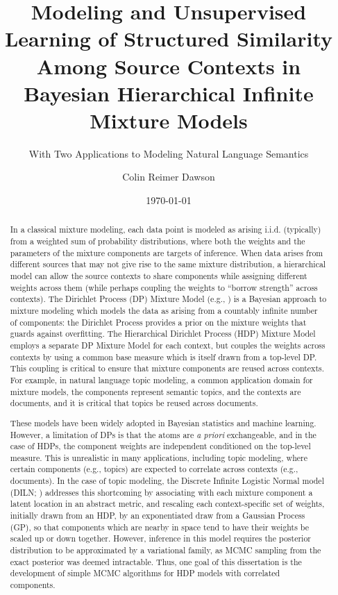 \documentclass[12pt,letterpaper]{report}
\title{Modeling and Unsupervised Learning of Structured Similarity Among
  Source Contexts in Bayesian Hierarchical Infinite Mixture Models}
\subtitle{With Two Applications to Modeling Natural Language Semantics}
\author{Colin Reimer Dawson}
\date{\today}
\begin{document}
\maketitle

\tableofcontents

\onehalfspacing

\begin{abstract}
In a classical mixture modeling, each data point is modeled as arising
i.i.d. (typically) from a weighted sum of probability distributions,
where both the weights and the parameters of the mixture components
are targets of inference.  When data arises from different sources
that may not give rise to the same mixture distribution, a
hierarchical model can allow the source contexts to share components while
assigning different weights across them (while perhaps coupling the
weights to ``borrow strength'' across contexts).  The Dirichlet
Process (DP) Mixture Model (e.g., \citet{rasmussen2000infinite}) is a Bayesian
approach to mixture modeling which models the data as arising from a countably
infinite number of components: the Dirichlet Process provides a prior
on the mixture weights that guards against overfitting.  The Hierarchical 
Dirichlet Process (HDP) Mixture Model \citep{teh2006hierarchical} employs
a separate DP Mixture Model for each context, but
couples the weights across contexts by using a common base measure which is
itself drawn from a top-level DP.  This coupling is critical to ensure
that mixture components are reused across contexts.
For example, in natural language topic modeling, a common application
domain for mixture models, the components represent semantic topics,
and the contexts are documents, and it is critical that topics be reused
across documents.

These models have been widely adopted in Bayesian statistics and
machine learning.  However, a limitation of DPs is that the atoms
are {\it a priori} exchangeable, and in the case of HDPs, the
component weights are independent conditioned on the top-level
measure.  This is unrealistic in many applications, including topic modeling, where certain
components (e.g., topics) are expected to correlate across contexts
(e.g., documents).  In the case of topic modeling, the Discrete
Infinite Logistic Normal model (DILN; \citet{paisley2011discrete}) addresses
this shortcoming by associating with each mixture component a latent
location in an abstract metric, and rescaling each context-specific
set of weights, initially drawn from an HDP, 
by an exponentiated draw from a Gaussian Process (GP), so that
components which are nearby in space tend to have their weights be
scaled up or down together.  However, inference in this model requires
the posterior distribution to be approximated by a variational family,
as MCMC sampling from the exact posterior was deemed intractable.
Thus, one goal of this dissertation is the development of simple MCMC
algorithms for HDP models with correlated components.


\end{abstract}
\end{document}
